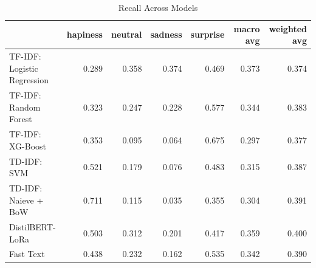 \begin{table}
\caption{Recall Across Models}
\begin{tabular}{lrrrrrr}
\toprule
 & hapiness & neutral & sadness & surprise & macro avg & weighted avg \\
\midrule
TF-IDF: Logistic Regression & 0.289 & 0.358 & 0.374 & 0.469 & 0.373 & 0.374 \\
TF-IDF: Random Forest & 0.323 & 0.247 & 0.228 & 0.577 & 0.344 & 0.383 \\
TF-IDF: XG-Boost & 0.353 & 0.095 & 0.064 & 0.675 & 0.297 & 0.377 \\
TD-IDF: SVM & 0.521 & 0.179 & 0.076 & 0.483 & 0.315 & 0.387 \\
TD-IDF: Naieve + BoW & 0.711 & 0.115 & 0.035 & 0.355 & 0.304 & 0.391 \\
DistilBERT-LoRa & 0.503 & 0.312 & 0.201 & 0.417 & 0.359 & 0.400 \\
Fast Text & 0.438 & 0.232 & 0.162 & 0.535 & 0.342 & 0.390 \\
\bottomrule
\end{tabular}
\end{table}
